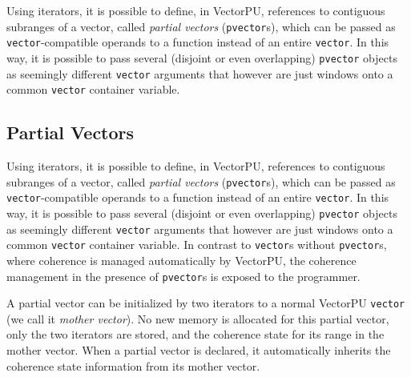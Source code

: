 Using iterators, it is possible to define, in VectorPU, references to
contiguous subranges of a vector,
called \textit{partial vectors} (\texttt{pvector}s), 
which can be passed as \texttt{vector}-compatible
operands to a function instead of an entire \texttt{vector}.
In this way, it is possible to pass several (disjoint or even
overlapping) \texttt{pvector} objects as seemingly different \texttt{vector}
arguments that however are just windows onto
a common \texttt{vector} container variable. 





\subsection{Partial Vectors}
\label{sec:Partial Vectors}


Using iterators, it is possible to define, in VectorPU, references to
contiguous subranges of a vector,
called \textit{partial vectors} (\texttt{pvector}s), 
which can be passed as \texttt{vector}-compatible
operands to a function instead of an entire \texttt{vector}.
In this way, it is possible to pass several (disjoint or even
overlapping) \texttt{pvector} objects as seemingly different \texttt{vector}
arguments that however are just windows onto
a common \texttt{vector} container variable. 
In contrast to \texttt{vector}s without \texttt{pvector}s, where coherence is 
managed automatically by VectorPU, the coherence 
management in the presence of \texttt{pvector}s 
is exposed to the programmer.

A partial vector can be initialized by two iterators to a normal VectorPU \texttt{vector} (we call it \emph{mother vector}).
No new memory is allocated for this partial vector, 
only the two iterators are stored, 
and the coherence state for its range in the mother vector.
When a partial vector is declared, it automatically
inherits the coherence state information
from its mother vector. 

